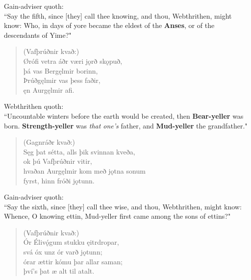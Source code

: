 \bvb Gain-adviser quoth: \\ “Say the fifth, since [they] call thee knowing, and thou, Webthrithen, might know: Who, in days of yore became the eldest of the \textbf{Anses}, or of the descendants of Yime?" \\

\begin{verse}
(Vafþrúðnir kvað:) \\%
\bva Ørófi vetra \hld áðr væri jǫrð skǫpuð, \\%
\ind þá vas Bergęlmir borinn, \\%
Þrúðgęlmir \hld vas þess faðir, \\%
\ind ęn Aurgęlmir afi.\\%
\end{verse}

\bvb Webthrithen quoth: \\ “Uncountable winters before the earth would be created, then \textbf{Bear-yeller} was born. \textbf{Strength-yeller} was \emph{that one's} father, and \textbf{Mud-yeller} the grandfather." \\

\begin{verse}
(Gagnráðr kvað:) \\%
\bva Sęg þat sétta, \hld alls þik svinnan kveða, \\%
\ind ok þú Vafþrúðnir vitir, \\%
hvaðan Aurgęlmir kom \hld með jǫtna sonum \\%
\ind fyrst, hinn fróði jǫtunn.\\%
\end{verse}

\bvb Gain-adviser quoth: \\ “Say the sixth, since [they] call thee wise, and thou, Webthrithen, might know: Whence, O knowing ettin, Mud-yeller first came among the sons of ettins?" \\

\begin{verse}
(Vafþrúðnir kvað:) \\%
\bva Ór Élivǫ́gum \hld stukku ęitrdropar, \\%
\ind svá óx unz ór varð jǫtunn; \\%
órar ættir \hld kómu þar allar saman; \\%
\ind því's þat æ alt til atalt.\footnotemark[20]\\%
\end{verse}

